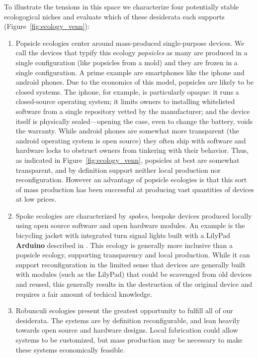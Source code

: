 To illustrate the tensions in this space we characterize four potentially stable ecologogical niches and evaluate which of these desiderata each supports (Figure~\ref{fig:ecology_venn}):

\begin{enumerate}

\item Popsicle ecologies center around mass-produced single-purpose devices. We call the devices that typify this ecology \emph{popsicles} as many are produced in a single configuration (like popsicles from a mold) and they are frozen in a single configuration. 
A prime example are smartphones like the iphone and android phones.
Due to the economics of this model, popsicles are likely to be closed systems. 
The iphone, for example, is particularly opaque: it runs a closed-source operating system; it limits owners to installing whitelisted software from a single repository vetted by the manufacturer; and the device itself is physically sealed---opening the case, even to change the battery, voids the warranty. 
While android phones are somewhat more transparent (the android operating system is open source) they often ship with software and hardware locks to obstruct owners from tinkering with their behavior.
Thus, as indicated in Figure~\ref{fig:ecology_venn}, popsicles at best are somewhat transparent, and by definition support neither local production nor reconfiguration. 
However an advantage of popsicle ecologies is that this sort of mass production has been successful at producing vast quantities of devices at low prices.

\item Spoke ecologies are characterized by \emph{spokes}, bespoke devices produced locally using open source software and open hardware modules.
An example is the bicycling jacket with integrated turn signal lights built with a LilyPad \textbf{Arduino} described in \citep{buechley_wild_lilypads}. 
This ecology is generally more inclusive than a popsicle ecology, supporting transparency and local production. 
While it can support reconfiguration in the limited sense that devices are generally built with modules (such as the LilyPad) that could be scavenged from old devices and reused, this generally results in the destruction of the original device and requires a fair amount of techical knowledge.

\item Robunculi ecologies present the greatest opportunity to fulfill all of our desiderata. The systems are by definition reconfigurable, and lean heavily towards open source and hardware designs. Local fabrication could allow systems to be customized, but mass production may be necessary to make these systems economically feasible.


\end{enumerate}
